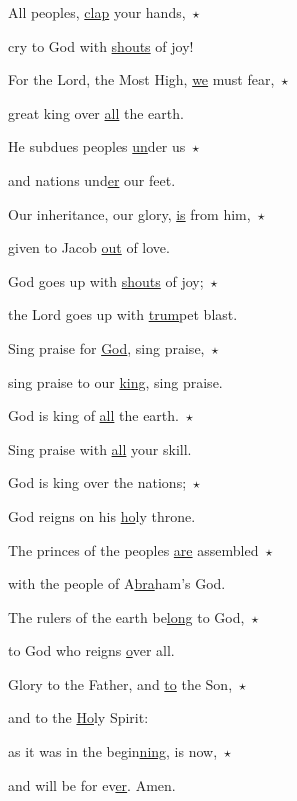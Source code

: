 \noindent All peoples, \uline{clap} your hands,~$\star$~\nopagebreak

cry to God with \uline{shouts} of joy!

\noindent For the Lord, the Most High, \uline{we} must fear,~$\star$~\nopagebreak

great king over \uline{all} the earth.

\noindent He subdues peoples \uline{un}der us~$\star$~\nopagebreak

and nations und\uline{er} our feet.

\noindent Our inheritance, our glory, \uline{is} from him,~$\star$~\nopagebreak

given to Jacob \uline{out} of love.

\noindent God goes up with \uline{shouts} of joy;~$\star$~\nopagebreak

the Lord goes up with \uline{trum}pet blast.

\noindent Sing praise for \uline{God}, sing praise,~$\star$~\nopagebreak

sing praise to our \uline{king}, sing praise.

\noindent God is king of \uline{all} the earth.~$\star$~\nopagebreak

Sing praise with \uline{all} your skill.

\noindent God is king o{ver} the nations;~$\star$~\nopagebreak

God reigns on his \uline{ho}ly throne.

\noindent The princes of the peoples \uline{are} assembled~$\star$~\nopagebreak

with the people of A\uline{bra}ham’s God.

\noindent The rulers of the earth be\uline{long} to God,~$\star$~\nopagebreak

to God who reigns \uline{o}ver all.

\noindent Glory to the Father, and \uline{to} the Son,~$\star$~\nopagebreak

and to the \uline{Ho}ly Spirit:

\noindent as it was in the begin\uline{ning}, is now,~$\star$~\nopagebreak

and will be for ev\uline{er}. Amen.